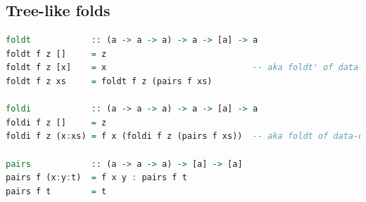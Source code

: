\subsection{Tree-like folds}
\begin{lstlisting}[language=Haskell]
foldt            :: (a -> a -> a) -> a -> [a] -> a
foldt f z []     = z
foldt f z [x]    = x                             -- aka foldt' of data-ordlist
foldt f z xs     = foldt f z (pairs f xs)
 
foldi            :: (a -> a -> a) -> a -> [a] -> a
foldi f z []     = z
foldi f z (x:xs) = f x (foldi f z (pairs f xs))  -- aka foldt of data-ordlist
 
pairs            :: (a -> a -> a) -> [a] -> [a]
pairs f (x:y:t)  = f x y : pairs f t
pairs f t        = t
\end{lstlisting}

\clearpage